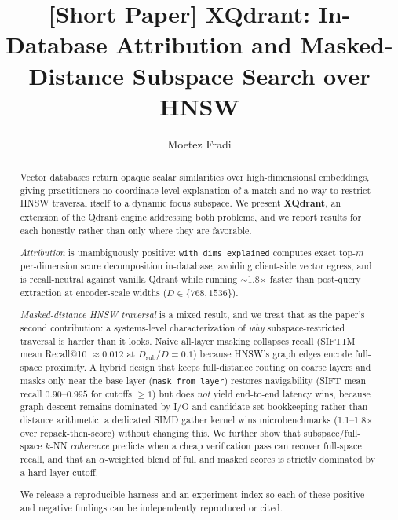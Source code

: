 \documentclass[sigconf,review,balance=false]{acmart}
\begin{document}
\title{[Short Paper] XQdrant: In-Database Attribution and Masked-Distance
  Subspace Search over HNSW}

\author{Moetez Fradi}

\renewcommand{\shortauthors}{Fradi}

\begin{abstract}
Vector databases return opaque scalar similarities over high-dimensional
embeddings, giving practitioners no coordinate-level explanation of a match and
no way to restrict HNSW traversal itself to a dynamic focus subspace. We present
\textbf{XQdrant}, an extension of the Qdrant engine addressing both problems, and
we report results for each honestly rather than only where they are favorable.

\emph{Attribution} is unambiguously positive: \texttt{with\_dims\_explained}
computes exact top-$m$ per-dimension score decomposition in-database, avoiding
client-side vector egress, and is recall-neutral against vanilla Qdrant while
running $\sim$1.8$\times$ faster than post-query extraction at encoder-scale
widths ($D\in\{768,1536\}$).

\emph{Masked-distance HNSW traversal} is a mixed result, and we treat that as
the paper's second contribution: a systems-level characterization of \emph{why}
subspace-restricted traversal is harder than it looks. Naive all-layer masking
collapses recall (SIFT1M mean Recall@10 $\approx 0.012$ at
$D_{\mathrm{sub}}/D=0.1$) because HNSW's graph edges encode full-space
proximity. A hybrid design that keeps full-distance routing on coarse layers
and masks only near the base layer (\texttt{mask\_from\_layer}) restores
navigability (SIFT mean recall $0.90$--$0.995$ for cutoffs $\geq 1$) but does
\emph{not} yield end-to-end latency wins, because graph descent remains
dominated by I/O and candidate-set bookkeeping rather than distance arithmetic;
a dedicated SIMD gather kernel wins microbenchmarks (1.1--1.8$\times$ over
repack-then-score) without changing this. We further show that
subspace/full-space $k$-NN \emph{coherence} predicts when a cheap verification
pass can recover full-space recall, and that an $\alpha$-weighted blend of full
and masked scores is strictly dominated by a hard layer cutoff.

We release a reproducible harness and an experiment index so each of these
positive and negative findings can be independently reproduced or cited.
\end{abstract}
\end{document}
